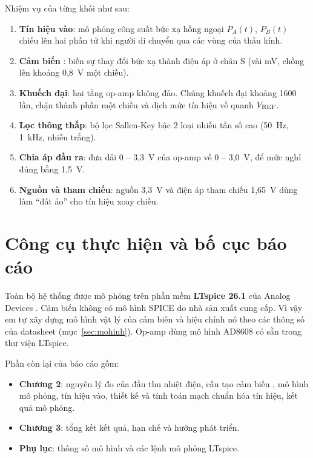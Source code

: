 Nhiệm vụ của từng khối như sau:
\begin{enumerate}
  \item \textbf{Tín hiệu vào}: mô phỏng công suất bức xạ hồng ngoại $P_A(t)$, $P_B(t)$ chiếu lên hai phần tử khi người di chuyển qua các vùng của thấu kính.
  \item \textbf{Cảm biến \PYD{}}: biến sự thay đổi bức xạ thành điện áp ở chân S (vài mV, chồng lên khoảng 0,8~V một chiều).
  \item \textbf{Khuếch đại}: hai tầng op-amp không đảo. Chúng khuếch đại khoảng 1600 lần, chặn thành phần một chiều và dịch mức tín hiệu về quanh $V_\mathrm{REF}$.
  \item \textbf{Lọc thông thấp}: bộ lọc Sallen-Key bậc 2 loại nhiễu tần số cao (50~Hz, 1~kHz, nhiễu trắng).
  \item \textbf{Chia áp đầu ra}: đưa dải 0 -- 3,3~V của op-amp về 0 -- 3,0~V, để mức nghỉ đúng bằng 1,5~V.
  \item \textbf{Nguồn và tham chiếu}: nguồn 3,3~V và điện áp tham chiếu 1,65~V dùng làm ``đất ảo'' cho tín hiệu xoay chiều.
\end{enumerate}

\section{Công cụ thực hiện và bố cục báo cáo}

Toàn bộ hệ thống được mô phỏng trên phần mềm \textbf{LTspice 26.1} của Analog Devices \cite{ltspice}. Cảm biến \PYD{} không có mô hình SPICE do nhà sản xuất cung cấp. Vì vậy em tự xây dựng mô hình vật lý của cảm biến và hiệu chỉnh nó theo các thông số của datasheet (mục~\ref{sec:mohinh}). Op-amp dùng mô hình AD8608 có sẵn trong thư viện LTspice.

Phần còn lại của báo cáo gồm:
\begin{itemize}
  \item \textbf{Chương 2}: nguyên lý đo của đầu thu nhiệt điện, cấu tạo cảm biến \PYD{}, mô hình mô phỏng, tín hiệu vào, thiết kế và tính toán mạch chuẩn hóa tín hiệu, kết quả mô phỏng.
  \item \textbf{Chương 3}: tổng kết kết quả, hạn chế và hướng phát triển.
  \item \textbf{Phụ lục}: thông số mô hình và các lệnh mô phỏng LTspice.
\end{itemize}
